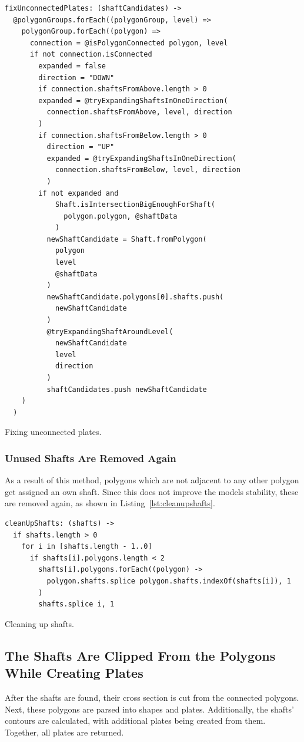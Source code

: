 \documentclass[../ClassicThesis.tex]{subfiles}
\begin{document}
\begin{listing}
\begin{verbatim}
fixUnconnectedPlates: (shaftCandidates) ->
  @polygonGroups.forEach((polygonGroup, level) =>
    polygonGroup.forEach((polygon) =>
      connection = @isPolygonConnected polygon, level
      if not connection.isConnected
        expanded = false
        direction = "DOWN"
        if connection.shaftsFromAbove.length > 0
        expanded = @tryExpandingShaftsInOneDirection(
          connection.shaftsFromAbove, level, direction
        )
        if connection.shaftsFromBelow.length > 0
          direction = "UP"
          expanded = @tryExpandingShaftsInOneDirection(
            connection.shaftsFromBelow, level, direction
          )
        if not expanded and 
            Shaft.isIntersectionBigEnoughForShaft(
              polygon.polygon, @shaftData
            )
          newShaftCandidate = Shaft.fromPolygon(
            polygon
            level
            @shaftData
          )
          newShaftCandidate.polygons[0].shafts.push(
            newShaftCandidate
          )
          @tryExpandingShaftAroundLevel(
            newShaftCandidate
            level
            direction
          )
          shaftCandidates.push newShaftCandidate
    )
  )
\end{verbatim}
\caption{Fixing unconnected plates.}
\label{lst:fixunconnected}
\end{listing}

\subsubsection{Unused Shafts Are Removed Again}

As a result of this method, polygons which are not adjacent to any other polygon get assigned an own shaft. Since this does not improve the models stability, these are removed again, as shown in Listing~\ref{lst:cleanupshafts}.

\begin{listing}
\begin{verbatim}
cleanUpShafts: (shafts) ->
  if shafts.length > 0
    for i in [shafts.length - 1..0]
      if shafts[i].polygons.length < 2
        shafts[i].polygons.forEach((polygon) ->
          polygon.shafts.splice polygon.shafts.indexOf(shafts[i]), 1
        )
        shafts.splice i, 1
\end{verbatim}
\caption{Cleaning up shafts.}
\label{lst:cleanupshafts}
\end{listing}

\subsection{The Shafts Are Clipped From the Polygons While Creating Plates}

After the shafts are found, their cross section is cut from the connected polygons. Next, these polygons are parsed into shapes and plates. Additionally, the shafts' contours are calculated, with additional plates being created from them. Together, all plates are returned.
\end{document}
